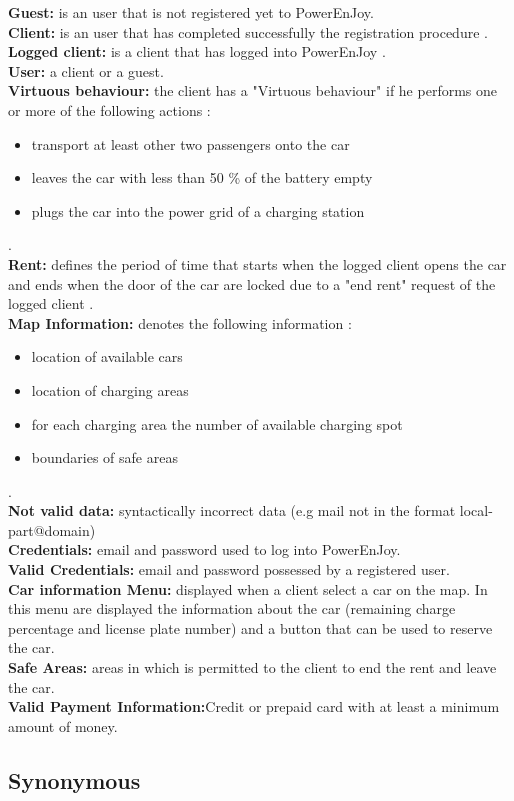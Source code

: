 \textbf{Guest:}
 is an user that is not registered yet to PowerEnJoy.\\
\textbf{Client:}
is an user that has completed successfully the registration procedure .\\
\textbf{Logged client:}
is a client that has logged into PowerEnJoy .\\
\textbf{User:}
a client or a guest.\\
\textbf{Virtuous  behaviour:}
the client has a "Virtuous behaviour" if he performs one or more of the following actions : 
\begin{itemize}
\item transport at least other two passengers onto the car
\item leaves the car with less than 50 \% of the battery empty
\item plugs the car into the power grid of a charging station
\end{itemize}
.\\
\textbf{Rent:} defines the period of time that starts when the logged client opens the car and ends when the door of the car are locked due to a "end rent" request of the logged client . %
\\
\textbf{Map Information:}
denotes the following information : 
\begin{itemize}
\item location of available cars
\item location of charging areas 
\item for each charging area the number of available charging spot
\item boundaries of safe areas 
\end{itemize}
.\\
\textbf{Not valid data:}
syntactically incorrect data (e.g mail not in the format local-part@domain)\\
\textbf{Credentials:}
email and password used to log into PowerEnJoy.\\
\textbf{Valid Credentials:}
email and password possessed by a registered user.\\
\textbf{Car information Menu:}
displayed when a client select a car on the map. In this menu are displayed the information about the car (remaining charge percentage and license plate number) and a button that can be used to reserve the car.\\
\textbf{Safe Areas:} 
areas in which is permitted to the client to end the rent and leave the car.
\\
\textbf{Valid Payment Information:}Credit or prepaid card with at least a minimum amount of money.
\\
\subsection{Synonymous}
